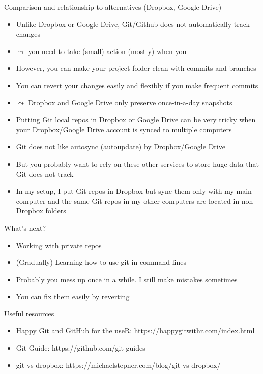 \documentclass[handout,pdftex,10pt,aspectratio=169]{beamer}
\newcommand{\backupbegin}{
  \newcounter{finalframe}
  \setcounter{finalframe}{\value{framenumber}}
}
\newcommand{\backupend}{
  \setcounter{framenumber}{\value{finalframe}}
}
\begin{document}
\begin{frame}{Comparison and relationship to alternatives (Dropbox, Google Drive)}
  \begin{itemize}[<+->]
    \item Unlike Dropbox or Google Drive, Git/Github does not automatically track changes 
    \item[] $\leadsto$ you need to take (small) action (mostly) when you 
    \item However, you can make your project folder clean with commits and branches
    \item You can revert your changes easily and flexibly if you make frequent commits 
    \item[] $\leadsto$ Dropbox and Google Drive only preserve once-in-a-day snapshots
    \bigskip
    \item Putting Git local repos in Dropbox or Google Drive can be very tricky
    when your Dropbox/Google Drive account is synced to multiple computers
    \item Git does not like autosync (autoupdate) by Dropbox/Google Drive
    \item But you probably want to rely on these other services to store huge data that Git does not track
    \item In my setup, I put Git repos in Dropbox but sync them only with my main computer and 
      the same Git repos in my other computers are located in non-Dropbox folders
  \end{itemize}
\end{frame}


\begin{frame}{What's next?}
  \begin{itemize}[<+->]
    \item Working with private repos
    \item (Gradually) Learning how to use git in command lines
    \medskip
    \item Probably you mess up once in a while. I still make mistakes sometimes 
    \item You can fix them easily by reverting
  \end{itemize}
\end{frame}


\begin{frame}{Useful resources}
  \begin{itemize}
    \item Happy Git and GitHub for the useR: https://happygitwithr.com/index.html
    \item Git Guide: https://github.com/git-guides
    \item git-vs-dropbox: https://michaelstepner.com/blog/git-vs-dropbox/
  \end{itemize}
\end{frame}


\backupbegin
\backupend
\end{document}
